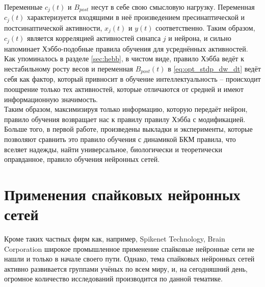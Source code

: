 \documentclass[a4paper,10pt]{article}
\begin{document}
\indent Переменные $c_{j}(t)$ и $B_{post}$ несут в себе свою смысловую нагрузку. Переменная $c_{j}(t)$ характеризуется входящими в неё произведением пресинаптической и постсинаптической активности, $x_{j}(t)$ и $y(t)$ соответственно. Таким образом, $c_{j}(t)$ является корреляцией активностей синапса $j$ и нейрона, и сильно напоминает Хэббо-подобные правила обучения для усреднённых активностей. Как упоминалось в разделе \ref{sec:hebb}, в чистом виде, правило Хэбба ведёт к нестабильному росту весов и переменная $B_{post}(t)$ в \eqref{eq:opt_stdp_dw_dt} ведёт себя как фактор, который привносит в обучение интеллектуальность -- происходит поощрение только тех активностей, которые отличаются от средней и имеют информационную значимость\cite{OptStdpFirst}.\\
\indent Таким образом, максимизируя только информацию, которую передаёт нейрон, правило обучения возвращает нас к правилу правилу Хэбба с модификацией. Больше того, в первой работе\cite{OptStdpFirst}, произведены выкладки и эксперименты, которые позволяют сравнить это правило обучения с динамикой БКМ правила, что вселяет надежды, найти универсальное, биологически и теоретически оправданное, правило обучения нейронных сетей.

\section{Применения спайковых нейронных сетей}
\indent Кроме таких частных фирм как, например, Spikenet Technology, Brain Corporation широкое промышленное применение спайковые нейронные сети не нашли и только в начале своего пути. Однако, тема спайковых нейронных сетей активно развивается группами учёных по всем миру, и, на сегодняшний день, огромное количество исследований производится по данной тематике.
\end{document}
